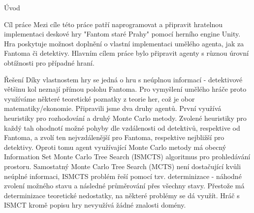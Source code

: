 \documentclass[portrait,a0paper,fontscale=0.25]{baposter}
\begin{document}
\begin{poster}
\begin{posterbox}[column=0,name=background]{Úvod}
\end{posterbox}

\begin{posterbox}[column=0, name=goals, below=background]{Cíl práce}
Mezi cíle této práce patří naprogramovat a připravit hratelnou implementaci deskové hry "Fantom staré Prahy" pomocí herního engine Unity. Hra poskytuje možnost doplnění o vlastní implementaci umělého agenta, jak za Fantoma či detektivy. Hlavním cílem práce bylo připravit agenty s různou úrovní obtížnosti pro případné hraní. 

\end{posterbox}

\begin{posterbox}[column=0, name=something1, below=goals]{Řešení}
Díky vlastnostem hry se jedná o hru s neúplnou informací - detektivové většinu kol neznají přímou polohu Fantoma. Pro vymyšlení umělého hráče proto využíváme některé teoretické poznatky z teorie her, což je obor matematiky/ekonomie. 
Připravili jsme dva druhy agentů. První využívá heuristiky pro rozhodování a druhý Monte Carlo metody. Zvolené heuristiky pro každý tah ohodnotí možné pohyby dle vzdálenosti od detektivů, respektive od Fantoma, a zvolí ten nejvzdálenější pro Fantoma, respektive nejbližší pro detektivy. Oproti tomu agent využívající Monte Carlo metody má obecný Information Set Monte Carlo Tree Search (ISMCTS) algoritmus pro prohledávání prostoru. Samostatný Monte Carlo Tree Search (MCTS) není dostačující kvůli neúplné informaci, ISMCTS problém řeší pomocí tzv. determinizace - náhodné zvolení možného stavu a následné průměrování přes všechny stavy. Přestože má determinizace teoretické nedostatky, na některé problémy se dá využít. Hráč s ISMCT kromě popisu hry nevyužívá žádné znalosti domény.





\end{posterbox}
\end{poster}
\end{document}

